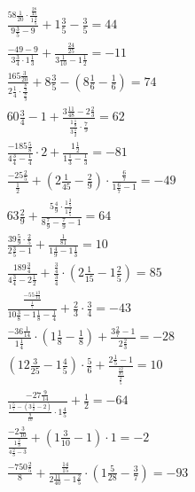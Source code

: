 \documentclass{article}
\begin{document}
\begin{gather}
    \frac{58\frac{1}{20} \cdot \frac{\frac{28}{45}}{1\frac{2}{5}}}{9\frac{3}{5} - 9} + 1\frac{3}{5} - \frac{3}{5} = 44 \\
    \frac{-49 - 9}{3\frac{3}{4} \cdot 1\frac{1}{3}} + \frac{\frac{24}{25}}{3\frac{1}{10} - 1\frac{1}{2}} = -11 \\
    \frac{165\frac{3}{20}}{2\frac{1}{4} \cdot \frac{\frac{8}{9}}{\frac{8}{9}}} + 8\frac{3}{5} - \left(8\frac{1}{6} - \frac{1}{6}\right) = 74 \\
    60\frac{3}{4} - 1 + \frac{3\frac{11}{48} - 2\frac{2}{3}}{\frac{1\frac{1}{8}}{3\frac{1}{2}} \cdot \frac{7}{9}} = 62 \\
    \frac{-185\frac{5}{8}}{4\frac{3}{4} - \frac{1}{4}} \cdot 2 + \frac{1\frac{1}{2}}{1\frac{1}{3} - \frac{1}{3}} = -81 \\
    \frac{-25\frac{2}{5}}{\frac{1}{2}} + \left(2\frac{1}{45} - \frac{2}{9}\right) \cdot \frac{\frac{6}{7}}{1\frac{6}{7} - 1} = -49 \\
    63\frac{2}{9} + \frac{5\frac{4}{9} \cdot \frac{1\frac{3}{5}}{1\frac{3}{5}}}{8\frac{7}{9} - \frac{7}{9} - 1} = 64 \\
    \frac{39\frac{5}{9} \cdot \frac{2}{5}}{2\frac{3}{5} - 1} + \frac{\frac{1}{81}}{1\frac{4}{9} - 1\frac{1}{3}} = 10 \\
    \frac{189\frac{3}{4}}{4\frac{3}{4} - 2\frac{1}{2}} + \frac{\frac{3}{4}}{\frac{3}{4}} \cdot \left(2\frac{1}{15} - 1\frac{2}{5}\right) = 85 \\
    \frac{\frac{-55\frac{13}{14}}{\frac{1}{7}}}{10\frac{3}{8} - 1\frac{1}{8} - \frac{1}{4}} + \frac{2}{3} \cdot \frac{3}{4} = -43 \\
    \frac{-36\frac{1}{14}}{1\frac{1}{4}} \cdot \left(1\frac{1}{8} - \frac{1}{8}\right) + \frac{3\frac{2}{7} - 1}{2\frac{2}{3}} = -28 \\
    \left(12\frac{3}{25} - 1\frac{4}{5}\right) \cdot \frac{5}{6} + \frac{2\frac{1}{5} - 1}{\frac{\frac{12}{35}}{\frac{2}{5}}} = 10 \\
    \frac{-27\frac{9}{14}}{\frac{1\frac{5}{7} - \left(3\frac{1}{2} - 2\right)}{\frac{9}{10}} \cdot 1\frac{4}{5}} + \frac{1}{2} = -64 \\
    \frac{-2\frac{3}{10}}{\frac{1\frac{2}{3}}{4\frac{2}{3} - 3}} + \left(1\frac{3}{10} - 1\right) \cdot 1 = -2 \\
    \frac{-750\frac{2}{5}}{8} + \frac{\frac{14}{15}}{2\frac{11}{40} - 1\frac{2}{5}} \cdot \left(1\frac{5}{28} - \frac{3}{7}\right) = -93
\end{gather}
\end{document}
